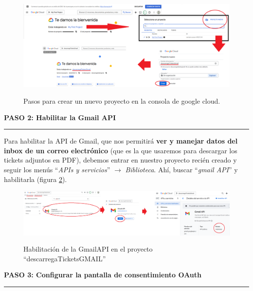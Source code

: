 \documentclass[a4paper,12pt]{report}
\begin{document}
	\FloatBarrier
	\setlength{\belowcaptionskip}{3pt}
	\begin{figure}[H]
		\centering
		\caption{Pasos para crear un nuevo proyecto en la consola de google cloud.}
		\includegraphics[width=1\linewidth]{img/googleCloudA.png}
		\label{fig:googleCloudA}
	\end{figure}
	\FloatBarrier
	
	
	
	
	
	
	
	
	
	
	
	
	
	\noindent \textbf{PASO 2: Habilitar la Gmail API}
	\vspace{.2em}
	\hrule
	\vspace{.5em}
	
	Para habilitar la API de Gmail, que nos permitirá \textbf{ver y manejar datos del inbox de un correo electrónico} (que es la que usaremos para descargar los tickets adjuntos en PDF), debemos entrar en nuestro proyecto recién creado y seguir los menús ``\textit{APIs y servicios}'' $\rightarrow$ \textit{Biblioteca}. Ahí, buscar ``\textit{gmail API}'' y habilitarla (figura \ref{fig:googleCloudC}).
	
	\FloatBarrier
	\setlength{\belowcaptionskip}{3pt}
	\begin{figure}[H]
		\centering
		\caption{Habilitación de la GmailAPI en el proyecto ``descarregaTicketsGMAIL''}
		\includegraphics[width=1\linewidth]{img/googleCloudC.png}
		\label{fig:googleCloudC}
	\end{figure}
	\FloatBarrier
	
	\noindent \textbf{PASO 3: Configurar la pantalla de consentimiento OAuth}
	\vspace{.1em}
	\hrule
	\vspace{.5em}
	
\end{document}
